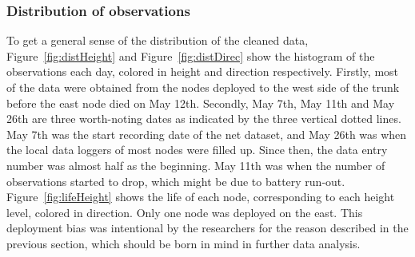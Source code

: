 \documentclass[11pt]{article}
\begin{document}
\subsubsection{Distribution of observations}
To get a general sense of the distribution of the cleaned data, Figure~\ref{fig:distHeight} and Figure~\ref{fig:distDirec} show the histogram of the observations each day, colored in height and direction respectively. Firstly, most of the data were obtained from the nodes deployed to the west side of the trunk before the east node died on May 12th. Secondly, May 7th, May 11th and May 26th are three worth-noting dates as indicated by the three vertical dotted lines. May 7th was the start recording date of the net dataset, and May 26th was when the local data loggers of most nodes were filled up. Since then, the data entry number was almost half as the beginning. May 11th was when the number of observations started to drop, which might be due to battery run-out. Figure~\ref{fig:lifeHeight} shows the life of each node, corresponding to each height level, colored in direction. Only one node was deployed on the east. This deployment bias was intentional by the researchers for the reason described in the previous section, which should be born in mind in further data analysis.
\end{document}

